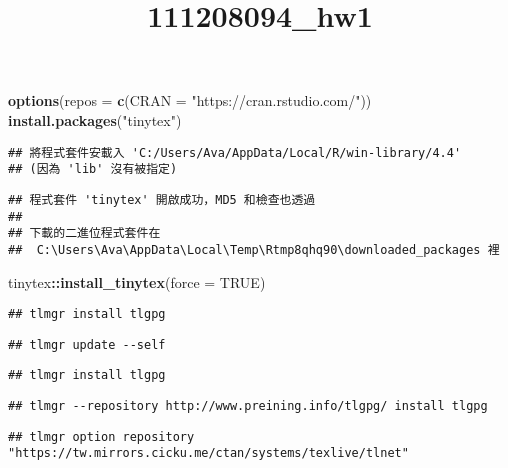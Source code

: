 \documentclass[
]{article}
\title{111208094\_hw1}
\author{}
\date{\vspace{-2.5em}}
\newenvironment{Shaded}{\begin{snugshade}}{\end{snugshade}}
\newcommand{\AttributeTok}[1]{\textcolor[rgb]{0.13,0.29,0.53}{#1}}
\newcommand{\ConstantTok}[1]{\textcolor[rgb]{0.56,0.35,0.01}{#1}}
\newcommand{\FunctionTok}[1]{\textcolor[rgb]{0.13,0.29,0.53}{\textbf{#1}}}
\newcommand{\NormalTok}[1]{#1}
\newcommand{\SpecialCharTok}[1]{\textcolor[rgb]{0.81,0.36,0.00}{\textbf{#1}}}
\newcommand{\StringTok}[1]{\textcolor[rgb]{0.31,0.60,0.02}{#1}}
\begin{document}
\maketitle

\begin{Shaded}
\begin{Highlighting}[]
\FunctionTok{options}\NormalTok{(}\AttributeTok{repos =} \FunctionTok{c}\NormalTok{(}\AttributeTok{CRAN =} \StringTok{"https://cran.rstudio.com/"}\NormalTok{))}
\FunctionTok{install.packages}\NormalTok{(}\StringTok{"tinytex"}\NormalTok{)}
\end{Highlighting}
\end{Shaded}

\begin{verbatim}
## 將程式套件安載入 'C:/Users/Ava/AppData/Local/R/win-library/4.4'
## (因為 'lib' 沒有被指定)
\end{verbatim}

\begin{verbatim}
## 程式套件 'tinytex' 開啟成功，MD5 和檢查也透過
## 
## 下載的二進位程式套件在
##  C:\Users\Ava\AppData\Local\Temp\Rtmp8qhq90\downloaded_packages 裡
\end{verbatim}

\begin{Shaded}
\begin{Highlighting}[]
\NormalTok{tinytex}\SpecialCharTok{::}\FunctionTok{install\_tinytex}\NormalTok{(}\AttributeTok{force =} \ConstantTok{TRUE}\NormalTok{)}
\end{Highlighting}
\end{Shaded}

\begin{verbatim}
## tlmgr install tlgpg
\end{verbatim}

\begin{verbatim}
## tlmgr update --self
\end{verbatim}

\begin{verbatim}
## tlmgr install tlgpg
\end{verbatim}

\begin{verbatim}
## tlmgr --repository http://www.preining.info/tlgpg/ install tlgpg
\end{verbatim}

\begin{verbatim}
## tlmgr option repository "https://tw.mirrors.cicku.me/ctan/systems/texlive/tlnet"
\end{verbatim}
\end{document}
